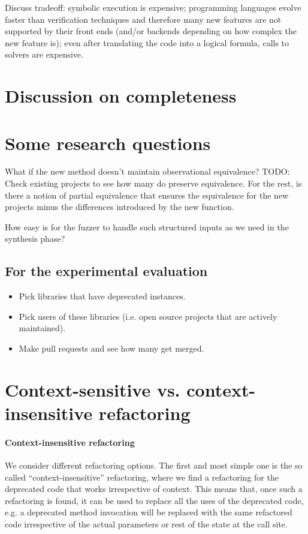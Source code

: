\documentclass[runningheads,a4paper]{llncs}
\begin{document}
Discuss tradeoff: symbolic execution is expensive; programming
languages evolve faster than verification techniques and therefore
many new features are not supported by their front ends (and/or
backends depending on how complex the new feature is); even after
translating the code into a logical formula, calls to solvers are
expensive.

\section{Discussion on completeness}



\section{Some research questions}

What if the new method doesn't maintain observational equivalence?
TODO: Check existing projects to see how many do preserve equivalence.
For the rest, is there a notion of partial equivalence that ensures the equivalence
for the new projects minus the differences introduced by the new function.

How easy is for the fuzzer to handle such structured inputs as we need in the
synthesis phase?


\subsection{For the experimental evaluation}
\begin{itemize}
\item Pick libraries that have deprecated instances.
\item Pick users of these libraries (i.e. open source projects that are actively maintained).
\item Make pull requests and see how many get merged.
\end{itemize}  

\section{Context-sensitive vs. context-insensitive refactoring}

\paragraph{Context-insensitive refactoring}
We consider different refactoring options. The first and most simple
one is the so called ``context-insensitive'' refactoring, where we
find a refactoring for the deprecated code that works irrespective of
context. This means that, once such a refactoring is found, it can be
used to replace all the uses of the deprecated code, e.g. a deprecated
method invocation will be replaced with the same refactored code
irrespective of the actual parameters or rest of the state at the call
site.
\end{document}
